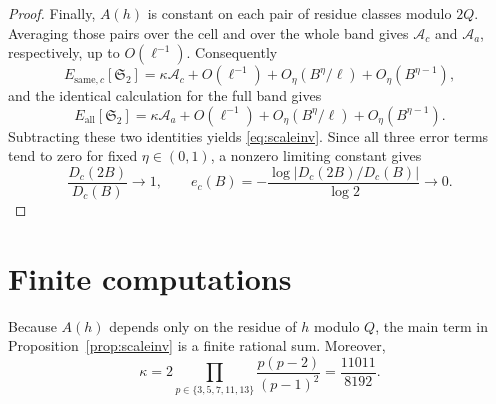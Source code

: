 \documentclass[11pt,a4paper]{article}
\theoremstyle{plain}
\theoremstyle{definition}
\theoremstyle{remark}
\renewcommand{\SS}{\mathfrak{S}}
\begin{document}
\begin{proof}
Finally, $A(h)$ is constant on each pair of residue classes modulo
$2Q$.  Averaging those pairs over the cell and over the whole band gives
$\mathcal A_c$ and $\mathcal A_a$, respectively, up to
$O(\ell^{-1})$.  Consequently
\[
 E_{\mathrm{same},c}[\SS_2]
 =\kappa\mathcal A_c
  +O(\ell^{-1})+O_\eta(B^\eta/\ell)
  +O_\eta(B^{\eta-1}),
\]
and the identical calculation for the full band gives
\[
 E_{\mathrm{all}}[\SS_2]
 =\kappa\mathcal A_a
  +O(\ell^{-1})+O_\eta(B^\eta/\ell)
  +O_\eta(B^{\eta-1}).
\]
Subtracting these two identities yields \eqref{eq:scaleinv}.  Since all
three error terms tend to zero for fixed $\eta\in(0,1)$, a nonzero
limiting constant gives
\[
 \frac{D_c(2B)}{D_c(B)}\longrightarrow1,
 \qquad
 e_c(B)=-\frac{\log|D_c(2B)/D_c(B)|}{\log2}\longrightarrow0.
\]
\end{proof}

\section{Finite computations}\label{sec:computations}

Because $A(h)$ depends only on the residue of $h$ modulo $Q$, the main
term in Proposition~\ref{prop:scaleinv} is a finite rational sum.
Moreover,
\begin{equation}\label{eq:kappa}
 \kappa
 =2\prod_{p\in\{3,5,7,11,13\}}\frac{p(p-2)}{(p-1)^2}
 =\frac{11011}{8192}.
\end{equation}
\end{document}
